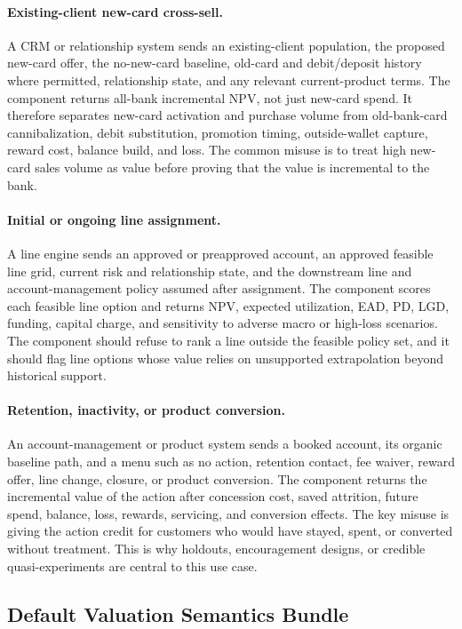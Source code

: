 \documentclass[11pt]{article}
\newcommand{\1}{\mathbf{1}}
\begin{document}
\paragraph{Existing-client new-card cross-sell.}
A CRM or relationship system sends an existing-client population, the proposed
new-card offer, the no-new-card baseline, old-card and debit/deposit history
where permitted, relationship state, and any relevant current-product terms.
The component returns all-bank incremental NPV, not just new-card spend. It
therefore separates new-card activation and purchase volume from old-bank-card
cannibalization, debit substitution, promotion timing, outside-wallet capture,
reward cost, balance build, and loss. The common misuse is to treat high
new-card sales volume as value before proving that the value is incremental to
the bank.

\paragraph{Initial or ongoing line assignment.}
A line engine sends an approved or preapproved account, an approved feasible
line grid, current risk and relationship state, and the downstream line and
account-management policy assumed after assignment. The component scores each
feasible line option and returns NPV, expected utilization, EAD, PD, LGD,
funding, capital charge, and sensitivity to adverse macro or high-loss
scenarios. The component should refuse to rank a line outside the feasible
policy set, and it should flag line options whose value relies on unsupported
extrapolation beyond historical support.

\paragraph{Retention, inactivity, or product conversion.}
An account-management or product system sends a booked account, its organic
baseline path, and a menu such as no action, retention contact, fee waiver,
reward offer, line change, closure, or product conversion. The component
returns the incremental value of the action after concession cost, saved
attrition, future spend, balance, loss, rewards, servicing, and conversion
effects. The key misuse is giving the action credit for customers who would
have stayed, spent, or converted without treatment. This is why holdouts,
encouragement designs, or credible quasi-experiments are central to this use
case.

\subsection{Default Valuation Semantics Bundle}
\label{sec:valuation-semantics-default}
\end{document}
